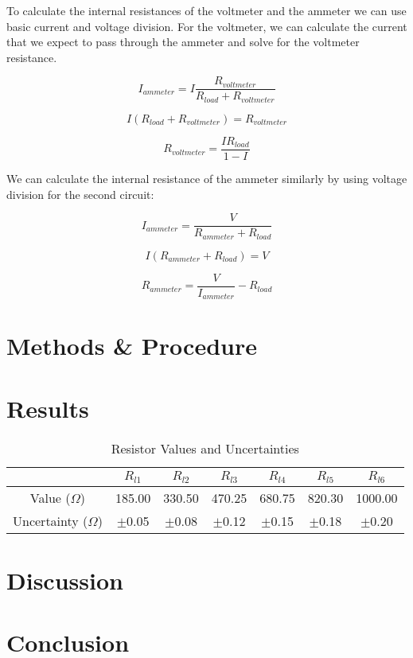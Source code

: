 \documentclass{article} %
\begin{document}
To calculate the internal resistances of the voltmeter and the ammeter we can use basic current and voltage division.
For the voltmeter, we can calculate the current that we expect to pass through the ammeter and solve for the voltmeter resistance.

\[
I_{ammeter} = I \frac{R_{voltmeter}}{R_{load} + R_{voltmeter}}
\]

\[
I(R_{load} + R_{voltmeter}) = R_{voltmeter}
\]

\[
R_{voltmeter} = \frac{I R_{load}}{1 - I}
\]

We can calculate the internal resistance of the ammeter similarly by using voltage division for the second circuit:

\[
I_{ammeter} = \frac{V}{R_{ammeter} + R_{load}}
\]

\[
I(R_{ammeter} + R_{load}) = V
\]

\[
R_{ammeter} = \frac{V}{I_{ammeter}} - R_{load}
\]

\section{Methods \& Procedure}

\section{Results}

\begin{table}[htbp]
\centering
\caption{Resistor Values and Uncertainties}
\begin{tabular}{|c|c|c|c|c|c|c|}
\hline
 & $R_{l1}$ & $R_{l2}$ & $R_{l3}$ & $R_{l4}$ & $R_{l5}$ & $R_{l6}$ \\
\hline
Value ($\Omega$) & 185.00 & 330.50 & 470.25 & 680.75 & 820.30 & 1000.00 \\
\hline
Uncertainty ($\Omega$) & $\pm$0.05 & $\pm$0.08 & $\pm$0.12 & $\pm$0.15 & $\pm$0.18 & $\pm$0.20 \\
\hline
\end{tabular}
\end{table}

\section{Discussion}

\section{Conclusion}

\label{last_page}

\newpage


\end{document}
